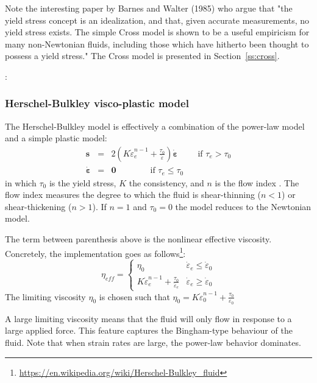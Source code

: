 Note the interesting paper by Barnes and Walter (1985) \cite{bawa85} who argue that 
"the yield stress concept is an idealization, and that, given accurate
measurements, no yield stress exists. The simple Cross model is shown to be a
useful empiricism for many non-Newtonian fluids, including those which have
hitherto been thought to possess a yield stress." The Cross model is presented 
in Section~\ref{ss:cross}.
 

\Literature: \cite{papa87,blmi97,mizi01,limd02,maky17,syga14,bingham,baru09,grol09,been80,svna18}

\subsubsection{Herschel-Bulkley visco-plastic model}

The Herschel-Bulkley model is effectively a combination of the power-law model and 
a simple plastic model:
\begin{eqnarray}
{\bm s} &=& 2 \left(  K \dot{\varepsilon}_e^{n-1} + \frac{\tau_0}{\dot{\varepsilon}}\right)\dot{\bm \varepsilon} \qquad \text{ if } {\tau}_{e}>\tau_0 \\
\dot{\bm \varepsilon} &=& {\bm 0} \qquad\qquad \text{if }{\tau}_{e} \leq \tau_0 
\end{eqnarray}
in which $\tau_0$ is the yield stress, $K$ the consistency, and $n$ is the flow index  \cite{demj04}.
The flow index measures the degree to which the fluid is shear-thinning ($n<1$) or shear-thickening ($n>1$).
If $n=1$ and $\tau_0=0$ the model reduces to the Newtonian model. 

The term between parenthesis above is the nonlinear effective viscosity. Concretely, the implementation goes as 
follows\footnote{\url{https://en.wikipedia.org/wiki/Herschel-Bulkley_fluid}}:
\[
\eta_{eff} = 
\left\{
\begin{array}{cc}
\eta_0 & \dot{\varepsilon}_e\leq \dot{\varepsilon}_0 \\ 
K \dot{\varepsilon}_e^{n-1} + \frac{\tau_0}{\dot{\varepsilon}_e} & \dot{\varepsilon}_e \geq \dot{\varepsilon}_0
\end{array}
\right.
\]
The limiting viscosity $\eta_0$ is chosen such that 
$\eta_0 =  K \dot{\varepsilon}_0^{n-1} + \frac{\tau_0}{\dot{\varepsilon}_0}$

A large limiting viscosity means that the fluid will only flow in response to a large applied force. 
This feature captures the Bingham-type behaviour of the fluid. 
Note that when strain rates are large, the power-law behavior dominates. 


